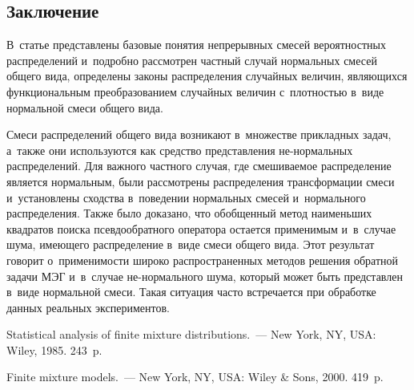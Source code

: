 \begin{multicols}{2}
\section{Заключение}

В~статье представлены базовые понятия непрерывных смесей вероятностных
 распределений и~подробно рассмотрен частный случай нормальных смесей общего вида, 
 определены законы распределения случайных величин, являющихся функциональным 
 преобразованием случайных величин с~плотностью в~виде нормальной смеси общего \mbox{вида}.

Смеси распределений общего вида возникают в~множестве прикладных задач, а~также 
они используются как средство представления не-нормальных распределений. Для важного частного 
случая, где смешиваемое распределение является нормальным, были рассмотрены распределения 
трансформации смеси и~установлены сходства в~поведении нормальных смесей и~нормального 
распределения. Также было доказано, что обобщенный метод наименьших квадратов поиска 
псевдообратного оператора остается применимым и~в~случае шума, имеющего распределение в~виде 
смеси общего вида. Этот результат говорит о~применимости широко распространенных методов решения 
обратной задачи МЭГ и~в~случае не-нор\-маль\-но\-го шума, который может быть представлен в~виде 
нормальной смеси. Такая ситуация часто встречается при обработке данных реальных экспериментов.


\vspace*{-12pt}

{\small\frenchspacing
{%
\begin{thebibliography}{99}

\vspace*{-4pt}

Statistical analysis of finite mixture distributions.~--- New York, NY, USA: Wiley, 1985. 243~p.

 Finite mixture models.~--- New York, NY, USA: Wiley \& Sons, 2000. 419~p.


\end{thebibliography}}}
\end{multicols}
